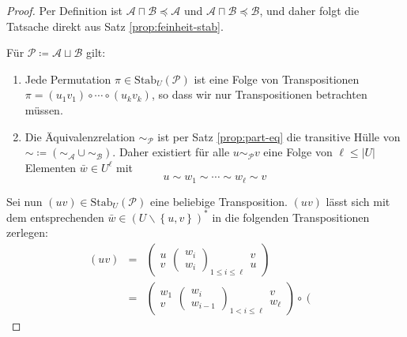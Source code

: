 \begin{proof}
Per Definition ist $\mathcal{A}\sqcap\mathcal{B}\preceq\mathcal{A}$
und $\mathcal{A}\sqcap\mathcal{B}\preceq\mathcal{B}$, und daher folgt
die Tatsache direkt aus Satz \ref{prop:feinheit-stab}.

Für $\mathcal{P}\coloneqq\mathcal{A}\sqcup\mathcal{B}$ gilt:

\begin{enumerate}
\item Jede Permutation $\pi\in\mathrm{Stab}_{U}\left(\mathcal{P}\right)$
ist eine Folge von Transpositionen $\pi=\left(u_{1}v_{1}\right)\circ\cdots\circ\left(u_{k}v_{k}\right)$,
so dass wir nur Transpositionen betrachten müssen.
\item Die Äquivalenzrelation $\sim_{\mathcal{P}}$ ist per Satz \ref{prop:part-eq}
die transitive Hülle von $\sim\coloneqq\left(\sim_{\mathcal{A}}\cup\sim_{\mathcal{B}}\right)$.
Daher existiert für alle $u\sim_{\mathcal{P}}v$ eine Folge von $\ell\leqslant\left|U\right|$
Elementen $\bar{w}\in U^{\ell}$ mit
\[
u\sim w_{1}\sim\cdots\sim w_{\ell}\sim v
\]
\end{enumerate}
Sei nun $\left(uv\right)\in\mathrm{Stab}_{U}\left(\mathcal{P}\right)$
eine beliebige Transposition. $\left(uv\right)$ lässt sich mit dem
entsprechenden $\bar{w}\in\left(U\backslash\left\{ u,v\right\} \right)^{*}$
in die folgenden Transpositionen zerlegen:
\begin{eqnarray*}
\left(uv\right) & = & \left(\begin{array}{c}
u\\
v
\end{array}\left(\begin{array}{c}
w_{i}\\
w_{i}
\end{array}\right)_{1\leqslant i\leqslant\ell}\begin{array}{c}
v\\
u
\end{array}\right)\\
 & = & \left(\begin{array}{c}
w_{1}\\
v
\end{array}\left(\begin{array}{c}
w_{i}\\
w_{i-1}
\end{array}\right)_{1<i\leqslant\ell}\begin{array}{c}
v\\
w_{\ell}
\end{array}\right)\circ\left(\begin{array}{c}

\end{array}
\end{eqnarray*}
\end{proof}
